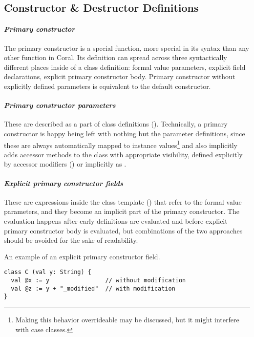 \subsection{Constructor \& Destructor Definitions}
\label{sec:constructor-destructor-def}

\paragraph{\em Primary constructor}
The primary constructor is a special function, more special in its syntax than any other function in Coral. Its definition can spread across three syntactically different places inside of a class definition: formal value parameters, explicit field declarations, explicit primary constructor body. Primary constructor without explicitly defined parameters is equivalent to the default constructor. 

\paragraph{\em Primary constructor parameters}
These are described as a part of class definitions (). Technically, a primary constructor is happy being left with nothing but the parameter definitions, since these are always automatically mapped to instance values\footnote{Making this behavior overrideable may be discussed, but it might interfere with case classes.} and also implicitly adds accessor methods to the class with appropriate visibility, defined explicitly by accessor modifiers () or implicitly as . 

\paragraph{\em Explicit primary constructor fields}
These are expressions inside the class template () that refer to the formal value parameters, and they become an implicit part of the primary constructor. The evaluation happens after early definitions are evaluated and before explicit primary constructor body is evaluated, but combinations of the two approaches should be avoided for the sake of readability. 

\example An example of an explicit primary constructor field. 
\begin{lstlisting}
class C (val y: String) {
  val @x := y                // without modification
  val @z := y + "_modified"  // with modification
}
\end{lstlisting}

